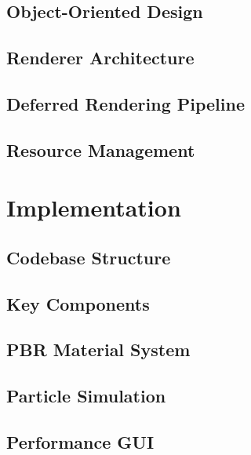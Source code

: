 \documentclass[12pt,a4paper,openright,twoside]{book}
\begin{document}
\section{Object-Oriented Design}

\section{Renderer Architecture}

\section{Deferred Rendering Pipeline}

\section{Resource Management}

\chapter{Implementation}
\label{chap:implementation}

\section{Codebase Structure}

\section{Key Components}

\section{PBR Material System}

\section{Particle Simulation}

\section{Performance GUI}

\end{document}
